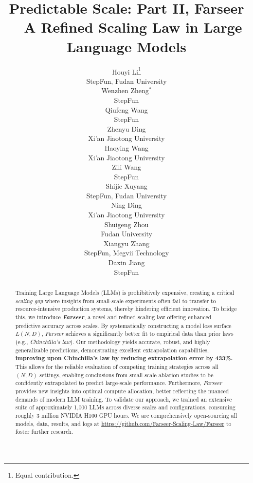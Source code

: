 \documentclass{article}
\title{Predictable Scale: Part II, Farseer -- A Refined Scaling Law in Large Language Models}
\author{
    Houyi Li\thanks{Equal contribution.} \\
    StepFun, Fudan University \\
\And
    Wenzhen Zheng$^{\ast}$ \\
    StepFun \\
\And
    Qiufeng Wang \\
    StepFun \\
\AND
    Zhenyu Ding \\
    Xi'an Jiaotong University \\
\And
    Haoying Wang \\
    Xi'an Jiaotong University \\
\And
    Zili Wang \\
    StepFun \\
\And
    Shijie Xuyang \\
    StepFun, Fudan University \\
\And
    Ning Ding \\
    Xi'an Jiaotong University \\
\And
    Shuigeng Zhou \\
    Fudan University \\
\And
    Xiangyu Zhang \\
    StepFun, Megvii Technology \\
\And
    Daxin Jiang \\
    StepFun \\
}
\begin{document}
\doparttoc
\faketableofcontents

\maketitle


\begin{abstract}
Training Large Language Models (LLMs) is prohibitively expensive, creating a critical \emph{scaling gap} where insights from small-scale experiments often fail to transfer to resource-intensive production systems, thereby hindering efficient innovation.
To bridge this, we introduce \textbf{\textit{Farseer}}, a novel and refined scaling law offering enhanced predictive accuracy across scales. By systematically constructing a model loss surface $L(N,D)$, \textit{Farseer} achieves a significantly better fit to empirical data than prior laws (e.g., \textit{Chinchilla's law}). 
Our methodology yields accurate, robust, and highly generalizable predictions, demonstrating excellent extrapolation capabilities, \textbf{improving upon Chinchilla's law by reducing extrapolation error by 433\%.} 
This allows for the reliable evaluation of competing training strategies across all $(N,D)$ settings, enabling conclusions from small-scale ablation studies to be confidently extrapolated to predict large-scale performance. 
Furthermore, \textit{Farseer} provides new insights into optimal compute allocation, better reflecting the nuanced demands of modern LLM training. To validate our approach, we trained an extensive suite of approximately 1,000 LLMs across diverse scales and configurations, consuming roughly 3 million NVIDIA H100 GPU hours. We are comprehensively open-sourcing all models, data, results, and logs at \url{https://github.com/Farseer-Scaling-Law/Farseer} to foster further research.
\end{abstract}

\newpage
\end{document}
